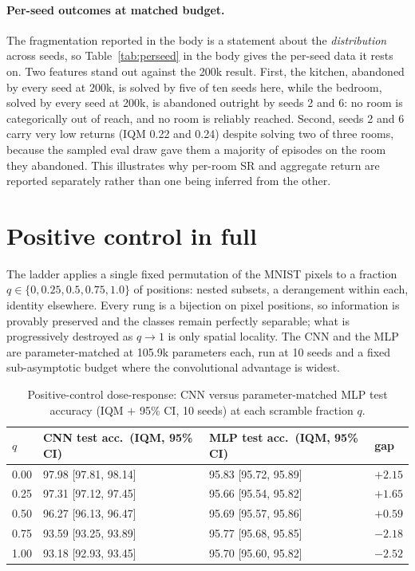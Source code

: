 \paragraph{Per-seed outcomes at matched budget.} The fragmentation reported in the body is a
statement about the \emph{distribution} across seeds, so Table~\ref{tab:perseed} in the body gives the
per-seed data it rests on. Two features stand out against the 200k result. First, the kitchen,
abandoned by every seed at 200k, is solved by five of ten seeds here, while the bedroom,
solved by every seed at 200k, is abandoned outright by seeds 2 and 6: no room is categorically
out of reach, and no room is reliably reached. Second, seeds 2 and 6 carry very low returns
(IQM 0.22 and 0.24) despite solving two of three rooms, because the sampled eval draw gave
them a majority of episodes on the room they abandoned. This illustrates why per-room SR and
aggregate return are reported separately rather than one being inferred from the other.


\clearpage
\section{Positive control in full}
\label{app:poscontrol}

The ladder applies a single fixed permutation of the MNIST pixels to a fraction
$q \in \{0, 0.25, 0.5, 0.75, 1.0\}$ of positions: nested subsets, a derangement within each,
identity elsewhere. Every rung is a bijection on pixel positions, so information is provably
preserved and the classes remain perfectly separable; what is progressively destroyed as
$q \to 1$ is only spatial locality. The CNN and the MLP are parameter-matched at 105.9k
parameters each, run at 10 seeds and a fixed sub-asymptotic budget where the convolutional
advantage is widest.

\begin{table}[!htbp]
\caption{Positive-control dose-response: CNN versus parameter-matched MLP test accuracy
(IQM $+$ 95\% CI, 10 seeds) at each scramble fraction $q$.}
\label{tab:pc}
\centering
\small
\begin{tabular}{llll}
\toprule
$q$ & CNN test acc.\ (IQM, 95\% CI) & MLP test acc.\ (IQM, 95\% CI) & gap \\
\midrule
0.00 & 97.98 [97.81, 98.14] & 95.83 [95.72, 95.89] & \textbf{$+2.15$} \\
0.25 & 97.31 [97.12, 97.45] & 95.66 [95.54, 95.82] & $+1.65$ \\
0.50 & 96.27 [96.13, 96.47] & 95.69 [95.57, 95.86] & $+0.59$ \\
0.75 & 93.59 [93.25, 93.89] & 95.77 [95.68, 95.85] & $-2.18$ \\
1.00 & 93.18 [92.93, 93.45] & 95.70 [95.60, 95.82] & $-2.52$ \\
\bottomrule
\end{tabular}
\end{table}


